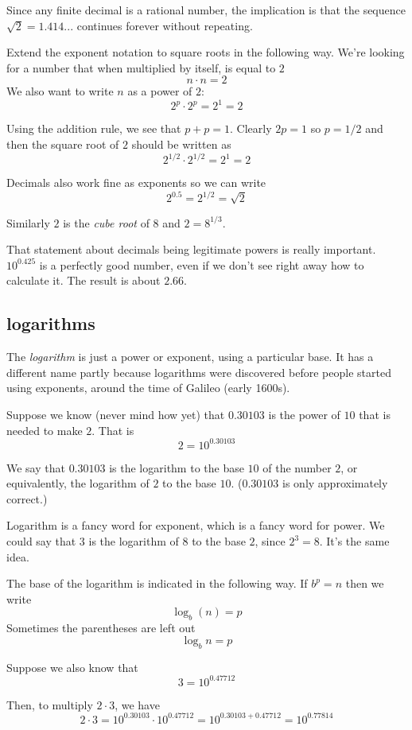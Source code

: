 \documentclass[11pt, oneside]{article}
\begin{document}
Since any finite decimal is a rational number, the implication is that the sequence $\sqrt{2} = 1.414...$ continues forever without repeating.

Extend the exponent notation to square roots in the following way.  We're looking for a number that when multiplied by itself, is equal to $2$
\[ n \cdot n = 2 \]
We also want to write $n$ as a power of $2$:
\[ 2^p \cdot 2^p = 2^1 = 2 \]

Using the addition rule, we see that $p + p = 1$.  Clearly $2p = 1$ so $p = 1/2$ and then the square root of $2$ should be written as
\[ 2^{1/2} \cdot 2^{1/2} = 2^1 = 2 \]

Decimals also work fine as exponents so we can write
\[ 2^{0.5} = 2^{1/2} = \sqrt{2} \]

Similarly $2$ is the \emph{cube root} of $8$ and $2 = 8^{1/3}$.

That statement about decimals being legitimate powers is really important.  $10^{0.425}$ is a perfectly good number, even if we don't see right away how to calculate it.  The result is about $2.66$.

\subsection*{logarithms}

The \emph{logarithm} is just a power or exponent, using a particular base. It has a different name partly because logarithms were discovered before people started using exponents, around the time of Galileo (early 1600s). 

Suppose we know (never mind how yet) that $0.30103$ is the power of $10$ that is needed to make $2$.  That is
\[ 2 = 10^{0.30103} \]

We say that $0.30103$ is the logarithm to the base $10$ of the number $2$, or equivalently, the logarithm of $2$ to the base $10$. ($0.30103$ is only approximately correct.)  

Logarithm is a fancy word for exponent, which is a fancy word for power. We could say that $3$ is the logarithm of $8$ to the base $2$, since $2^3 = 8$.  It's the same idea.  

The base of the logarithm is indicated in the following way.  If $b^p = n$ then we write
\[ \log_b (n) = p \]
Sometimes the parentheses are left out
\[ \log_b n = p \]

Suppose we also know that
\[ 3 = 10^{0.47712} \]

Then, to multiply $2 \cdot 3$, we have
\[ 2 \cdot 3 = 10^{0.30103} \cdot 10^{0.47712} = 10^{0.30103 + 0.47712} = 10^{0.77814} \]
\end{document}
